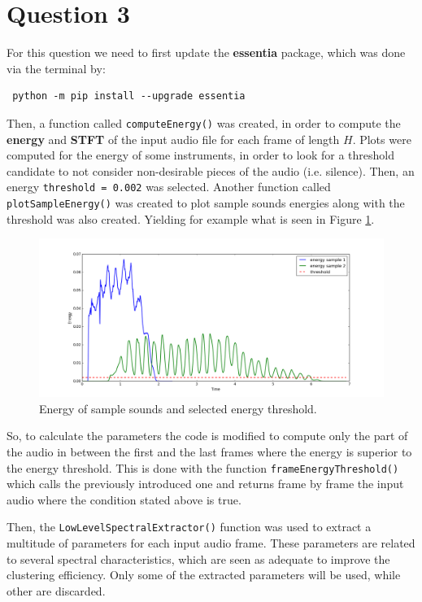 \documentclass[11pt]{article}
\begin{document}
\section*{Question 3}

For this question we need to first update the \textbf{essentia} package, which was done via the terminal by: \begin{verbatim} python -m pip install --upgrade essentia 
\end{verbatim}

\vspace{8pt} 
Then, a function called \texttt{computeEnergy()} was created, in order to compute the \textbf{energy} and \textbf{STFT} of the input audio file for each frame of length $H$. Plots were computed for the energy of some instruments, in order to look for a threshold candidate to not consider non-desirable pieces of the audio (i.e. silence). Then, an energy  \texttt{threshold = 0.002} was selected. Another function called \texttt{plotSampleEnergy()} was created to plot sample sounds energies along with the threshold was also created. Yielding for example what is seen in Figure \ref{fig:energy1}.

\begin{figure}[h]
  \includegraphics[width=\linewidth]{figure_1.png}
  \caption{Energy of sample sounds and selected energy threshold.}
  \label{fig:energy1}
\end{figure}

So, to calculate the parameters the code is modified to compute only the part of the audio in between the first and the last frames where the energy is superior to the energy threshold. This is done with the function \texttt{frameEnergyThreshold()} which calls the previously introduced one and returns frame by frame the input audio where the condition stated above is true.

\vspace{8pt} 
Then, the \texttt{LowLevelSpectralExtractor()} function was used to extract a multitude of parameters for each input audio frame. These parameters are related to several spectral characteristics, which are seen as adequate to improve the clustering efficiency. Only some of the extracted parameters will be used, while other are discarded.
\end{document}
